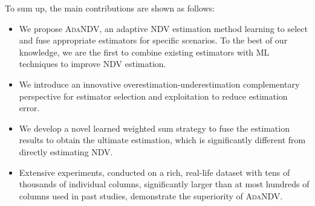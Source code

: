 To sum up, the main contributions are shown as follows:
\begin{itemize}
    \item We propose \textsc{AdaNDV}, an adaptive NDV estimation method learning to select and fuse appropriate estimators for specific scenarios. To the best of our knowledge, we are the first to combine existing estimators with ML techniques to improve NDV estimation. 
    \item We introduce an innovative overestimation-underestimation complementary perspective for estimator selection and exploitation to reduce estimation error.
    \item We develop a novel learned weighted sum strategy to fuse the estimation results to obtain the ultimate estimation, which is significantly different from directly estimating NDV.
    \item Extensive experiments, conducted on a rich, real-life dataset with tens of thousands of individual columns, significantly larger than at most hundreds of columns used in past studies, demonstrate the superiority of \textsc{AdaNDV}.
\end{itemize}
